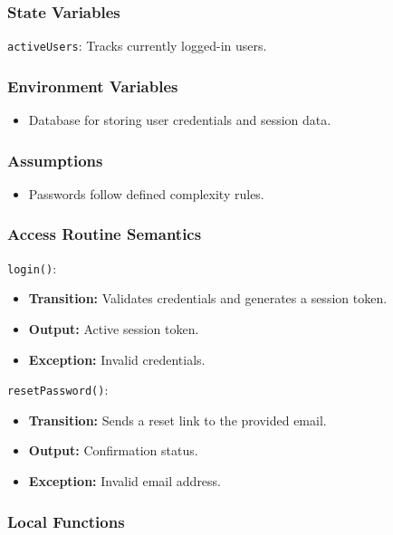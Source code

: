 \documentclass[12pt, titlepage]{article}
\begin{document}
\subsubsection{State Variables}

\texttt{activeUsers}: Tracks currently logged-in users.

\subsubsection{Environment Variables}

\begin{itemize}
    \item Database for storing user credentials and session data.
\end{itemize}

\subsubsection{Assumptions}

\begin{itemize}
    \item Passwords follow defined complexity rules.
\end{itemize}

\subsubsection{Access Routine Semantics}

\noindent \texttt{login()}:
\begin{itemize}
    \item \textbf{Transition:} Validates credentials and generates a session token.
    \item \textbf{Output:} Active session token.
    \item \textbf{Exception:} Invalid credentials.
\end{itemize}

\noindent \texttt{resetPassword()}:
\begin{itemize}
    \item \textbf{Transition:} Sends a reset link to the provided email.
    \item \textbf{Output:} Confirmation status.
    \item \textbf{Exception:} Invalid email address.
\end{itemize}

\subsubsection{Local Functions}
\end{document}
